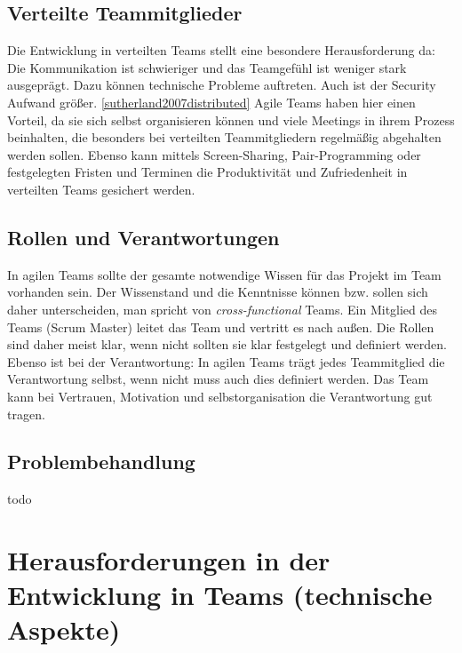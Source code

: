 \subsection{Verteilte Teammitglieder}
Die Entwicklung in verteilten Teams stellt eine besondere Herausforderung da: Die Kommunikation ist schwieriger und das Teamgefühl ist weniger stark ausgeprägt. Dazu können technische Probleme auftreten. Auch ist der Security Aufwand größer. \ref{sutherland2007distributed} Agile Teams haben hier einen Vorteil, da sie sich selbst organisieren können und viele Meetings in ihrem Prozess beinhalten, die besonders bei verteilten Teammitgliedern regelmäßig abgehalten werden sollen. Ebenso kann mittels Screen-Sharing, Pair-Programming oder festgelegten Fristen und Terminen die Produktivität und Zufriedenheit in verteilten Teams gesichert werden.
\subsection{Rollen und Verantwortungen}
In agilen Teams sollte der gesamte notwendige Wissen für das Projekt im Team vorhanden sein. Der Wissenstand und die Kenntnisse können bzw. sollen sich daher unterscheiden, man spricht von \textit{cross-functional} Teams.  Ein Mitglied des Teams (Scrum Master) leitet das Team und vertritt es nach außen. Die Rollen sind daher meist klar, wenn nicht sollten sie klar festgelegt und definiert werden. Ebenso ist bei der Verantwortung: In agilen Teams trägt jedes Teammitglied die Verantwortung selbst, wenn nicht muss auch dies definiert werden. Das Team kann bei Vertrauen, Motivation und selbstorganisation die Verantwortung gut tragen.
\subsection{Problembehandlung}
todo
\section{Herausforderungen in der Entwicklung in Teams (technische Aspekte)}

\chapterend